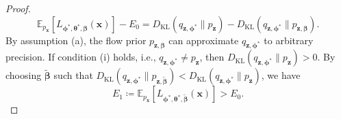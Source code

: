 \documentclass[10pt,a4paper]{amsart}
\newcommand{\mb}{\boldsymbol}
\begin{document}
\begin{proof}
\begin{equation}
\mathbb{E}_{p_{\mb{x}}}[L_{\mb{\phi}^*,\mb{\theta}^*,\mb{\beta}}(\mb{x})] - E_0
= D_{\mathrm{KL}}(q_{\mb{z},\mb{\phi}^*} \| p_{\mb{z}}) - D_{\mathrm{KL}}(q_{\mb{z},\mb{\phi}^*} \| p_{\mb{z},\mb{\beta}}).
\label{eq:prior_improvement}
\end{equation}
By assumption (a), the flow prior $p_{\mb{z},\mb{\beta}}$ can approximate $q_{\mb{z},\mb{\phi}^*}$ to arbitrary precision. If condition (i) holds, i.e., $q_{\mb{z},\mb{\phi}^*} \neq p_{\mb{z}}$, then $D_{\mathrm{KL}}(q_{\mb{z},\mb{\phi}^*} \| p_{\mb{z}}) > 0$. By choosing $\tilde{\mb{\beta}}$ such that $D_{\mathrm{KL}}(q_{\mb{z},\mb{\phi}^*} \| p_{\mb{z},\tilde{\mb{\beta}}}) < D_{\mathrm{KL}}(q_{\mb{z},\mb{\phi}^*} \| p_{\mb{z}})$, we have
\begin{equation}
E_1 \coloneqq \mathbb{E}_{p_{\mb{x}}}[L_{\mb{\phi}^*,\mb{\theta}^*,\tilde{\mb{\beta}}}(\mb{x})] > E_0.
\label{eq:E1_gt_E0}
\end{equation}


\end{proof}
\end{document}
